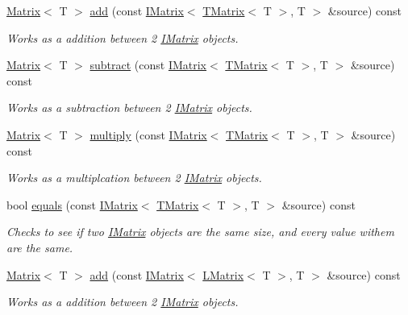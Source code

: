 \begin{DoxyCompactItemize}
\mbox{\hyperlink{class_matrix}{Matrix}}$<$ T $>$ \mbox{\hyperlink{class_matrix_aab90764c401b55d9a80fc20c50593041}{add}} (const \mbox{\hyperlink{class_i_matrix}{I\+Matrix}}$<$ \mbox{\hyperlink{class_t_matrix}{T\+Matrix}}$<$ T $>$, T $>$ \&source) const
\begin{DoxyCompactList}\small\item\em Works as a addition between 2 \mbox{\hyperlink{class_i_matrix}{I\+Matrix}} objects. \end{DoxyCompactList}\item 
\mbox{\hyperlink{class_matrix}{Matrix}}$<$ T $>$ \mbox{\hyperlink{class_matrix_ad319fb2dd61bb12ebcdb81c693d37d8c}{subtract}} (const \mbox{\hyperlink{class_i_matrix}{I\+Matrix}}$<$ \mbox{\hyperlink{class_t_matrix}{T\+Matrix}}$<$ T $>$, T $>$ \&source) const
\begin{DoxyCompactList}\small\item\em Works as a subtraction between 2 \mbox{\hyperlink{class_i_matrix}{I\+Matrix}} objects. \end{DoxyCompactList}\item 
\mbox{\hyperlink{class_matrix}{Matrix}}$<$ T $>$ \mbox{\hyperlink{class_matrix_a26704cc156b59005206365eb6a008b41}{multiply}} (const \mbox{\hyperlink{class_i_matrix}{I\+Matrix}}$<$ \mbox{\hyperlink{class_t_matrix}{T\+Matrix}}$<$ T $>$, T $>$ \&source) const
\begin{DoxyCompactList}\small\item\em Works as a multiplcation between 2 \mbox{\hyperlink{class_i_matrix}{I\+Matrix}} objects. \end{DoxyCompactList}\item 
bool \mbox{\hyperlink{class_matrix_a8fb3844da255c2db6c7539559f7957ab}{equals}} (const \mbox{\hyperlink{class_i_matrix}{I\+Matrix}}$<$ \mbox{\hyperlink{class_t_matrix}{T\+Matrix}}$<$ T $>$, T $>$ \&source) const
\begin{DoxyCompactList}\small\item\em Checks to see if two \mbox{\hyperlink{class_i_matrix}{I\+Matrix}} objects are the same size, and every value withem are the same. \end{DoxyCompactList}\item 
\mbox{\hyperlink{class_matrix}{Matrix}}$<$ T $>$ \mbox{\hyperlink{class_matrix_ae9fddaf07917b365eacca00df05d4db5}{add}} (const \mbox{\hyperlink{class_i_matrix}{I\+Matrix}}$<$ \mbox{\hyperlink{class_l_matrix}{L\+Matrix}}$<$ T $>$, T $>$ \&source) const
\begin{DoxyCompactList}\small\item\em Works as a addition between 2 \mbox{\hyperlink{class_i_matrix}{I\+Matrix}} objects. \end{DoxyCompactList}\item 

\end{DoxyCompactItemize}
